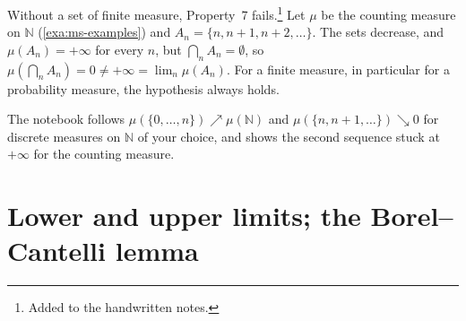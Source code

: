 \begin{remark}\label{rem:ms-continuity-finite}
Without a set of finite measure, Property~7 fails.\footnote{Added to the handwritten notes.} Let $\mu$ be the counting measure on
$\mathbb N$ (\cref{exa:ms-examples}) and $A_n=\{n,n+1,n+2,\dots\}$. The sets decrease, and
$\mu(A_n)=+\infty$ for every $n$, but $\bigcap_nA_n=\emptyset$, so
$\mu(\bigcap_nA_n)=0\ne+\infty=\lim_n\mu(A_n)$. For a finite measure, in particular for a
probability measure, the hypothesis always holds.
\end{remark}

\begin{remark}[computational]\label{rem:ms-code-continuity}
The notebook follows $\mu(\{0,\dots,n\})\nearrow\mu(\mathbb N)$ and
$\mu(\{n,n+1,\dots\})\searrow0$ for discrete measures on $\mathbb N$ of your choice, and shows
the second sequence stuck at $+\infty$ for the counting measure.
\end{remark}


\section{Lower and upper limits; the Borel--Cantelli lemma}\label{sec:ms-borel-cantelli}

